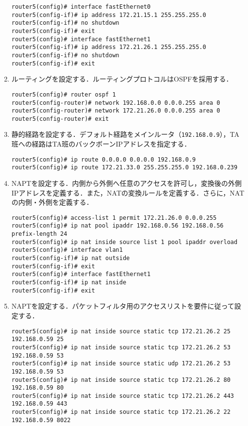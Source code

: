 \begin{enumerate}
          \begin{lstlisting}
router5(config)# interface fastEthernet0
router5(config-if)# ip address 172.21.15.1 255.255.255.0
router5(config-if)# no shutdown
router5(config-if)# exit
router5(config)# interface fastEthernet1
router5(config-if)# ip address 172.21.26.1 255.255.255.0
router5(config-if)# no shutdown
router5(config-if)# exit
    \end{lstlisting}
    \item ルーティングを設定する．ルーティングプロトコルはOSPFを採用する．
          \begin{lstlisting}
router5(config)# router ospf 1
router5(config-router)# network 192.168.0.0 0.0.0.255 area 0
router5(config-router)# network 172.21.26.0 0.0.0.255 area 0
router5(config-router)# exit
\end{lstlisting}
    \item 静的経路を設定する．デフォルト経路をメインルータ（\texttt{192.168.0.9}），TA班への経路はTA班のバックボーンIPアドレスを指定する．
          \begin{lstlisting}
router5(config)# ip route 0.0.0.0 0.0.0.0 192.168.0.9
router5(config)# ip route 172.21.33.0 255.255.255.0 192.168.0.239
\end{lstlisting}
    \item NAPTを設定する．内側から外側へ任意のアクセスを許可し，変換後の外側IPアドレスを定義する．また，NATの変換ルールを定義する．さらに，NATの内側・外側を定義する．
          \begin{lstlisting}
router5(config)# access-list 1 permit 172.21.26.0 0.0.0.255
router5(config)# ip nat pool ipaddr 192.168.0.56 192.168.0.56 prefix-length 24
router5(config)# ip nat inside source list 1 pool ipaddr overload
router5(config)# interface vlan1
router5(config-if)# ip nat outside
router5(config-if)# exit
router5(config)# interface fastEthernet1
router5(config-if)# ip nat inside
router5(config-if)# exit
\end{lstlisting}
    \item NAPTを設定する．パケットフィルタ用のアクセスリストを要件に従って設定する．
          \begin{lstlisting}
router5(config)# ip nat inside source static tcp 172.21.26.2 25 192.168.0.59 25
router5(config)# ip nat inside source static tcp 172.21.26.2 53 192.168.0.59 53
router5(config)# ip nat inside source static udp 172.21.26.2 53 192.168.0.59 53
router5(config)# ip nat inside source static tcp 172.21.26.2 80 192.168.0.59 80
router5(config)# ip nat inside source static tcp 172.21.26.2 443 192.168.0.59 443
router5(config)# ip nat inside source static tcp 172.21.26.2 22 192.168.0.59 8022
\end{lstlisting}
\end{enumerate}
